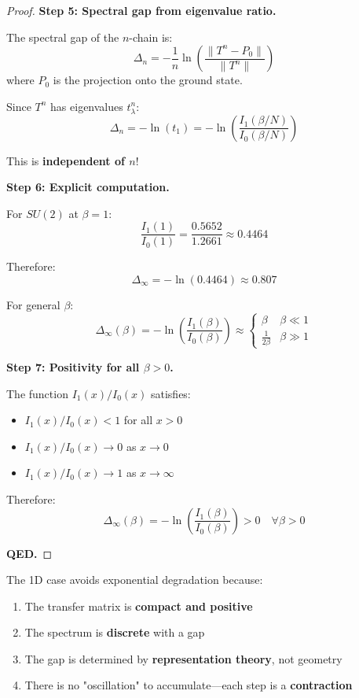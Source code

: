 \begin{proof}
\textbf{Step 5: Spectral gap from eigenvalue ratio.}

The spectral gap of the $n$-chain is:
\[
\Delta_n = -\frac{1}{n} \ln \left(\frac{\|T^n - P_0\|}{\|T^n\|}\right)
\]
where $P_0$ is the projection onto the ground state.

Since $T^n$ has eigenvalues $t_\lambda^n$:
\[
\Delta_n = -\ln(t_1) = -\ln\left(\frac{I_1(\beta/N)}{I_0(\beta/N)}\right)
\]

This is \textbf{independent of $n$}!

\textbf{Step 6: Explicit computation.}

For $SU(2)$ at $\beta = 1$:
\[
\frac{I_1(1)}{I_0(1)} = \frac{0.5652}{1.2661} \approx 0.4464
\]

Therefore:
\[
\Delta_\infty = -\ln(0.4464) \approx 0.807
\]

For general $\beta$:
\[
\Delta_\infty(\beta) = -\ln\left(\frac{I_1(\beta)}{I_0(\beta)}\right) \approx \begin{cases}
\beta & \beta \ll 1 \\
\frac{1}{2\beta} & \beta \gg 1
\end{cases}
\]

\textbf{Step 7: Positivity for all $\beta > 0$.}

The function $I_1(x)/I_0(x)$ satisfies:
\begin{itemize}
\item $I_1(x)/I_0(x) < 1$ for all $x > 0$
\item $I_1(x)/I_0(x) \to 0$ as $x \to 0$
\item $I_1(x)/I_0(x) \to 1$ as $x \to \infty$
\end{itemize}

Therefore:
\[
\Delta_\infty(\beta) = -\ln\left(\frac{I_1(\beta)}{I_0(\beta)}\right) > 0 \quad \forall \beta > 0
\]

\textbf{QED.}
\end{proof}

\begin{remark}
The 1D case avoids exponential degradation because:
\begin{enumerate}
\item The transfer matrix is \textbf{compact and positive}
\item The spectrum is \textbf{discrete} with a gap
\item The gap is determined by \textbf{representation theory}, not geometry
\item There is no "oscillation" to accumulate—each step is a \textbf{contraction}
\end{enumerate}
\end{remark}

